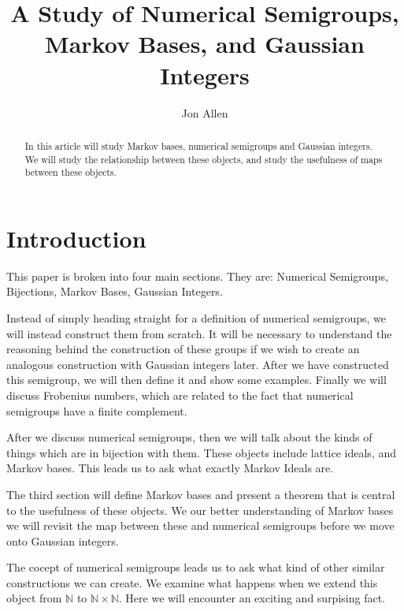 \documentclass[11pt]{amsart}
\theoremstyle{plain}
\theoremstyle{definition}
\begin{document}
\title{A Study of Numerical Semigroups, Markov Bases, and Gaussian Integers}
\author{Jon Allen}
\begin{abstract}
In this article will study Markov bases, numerical semigroups and Gaussian
integers. We will study the relationship between these objects, and study  the
usefulness of maps between these objects.
\end{abstract}
\maketitle
\section{Introduction}
This paper is broken into four main sections. They are: Numerical Semigroups,
Bijections, Markov Bases, Gaussian Integers.

Instead of simply heading straight for a definition of numerical semigroups,
we will instead construct them from scratch. It will be necessary to understand
the reasoning behind the construction of these groups if we wish to create an
analogous construction with Gaussian integers later. After we have constructed
this semigroup, we will then define it and show some examples. Finally we will
discuss Frobenius numbers, which are related to the fact that numerical
semigroups have a finite complement.

After we discuss numerical semigroups, then we will talk about the kinds of things
which are in bijection with them. These objects include lattice ideals, and Markov
bases. This leads us to ask what exactly Markov Ideals are.

The third section will define Markov bases and present a theorem that is central
to the usefulness of these objects. We our better understanding of Markov bases
we will revisit the map between these and numerical semigroups before we move
onto Gaussian integers.

The cocept of numerical semigroups leads us to ask what kind of other similar
constructions we can create. We examine what happens when we extend this object
from $\mathbb{N}$ to $\mathbb{N}\times \mathbb{N}$. Here we will encounter an
exciting and surpising fact.

\end{document}

